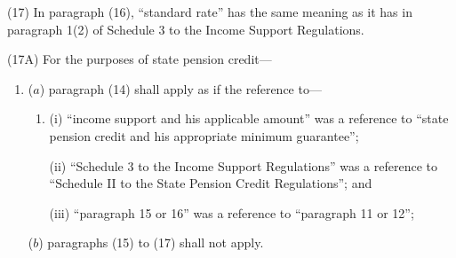 \documentclass[12pt,a4paper]{article}
\begin{document}
(17) In paragraph (16), “standard rate” has the same meaning as it has in paragraph 1(2) of Schedule 3 to the Income Support Regulations.

(17A) For the purposes of state pension credit—
\begin{enumerate}\item[]
($a$) paragraph (14) shall apply as if the reference to—
\begin{enumerate}\item[]
(i) “income support and his applicable amount” was a reference to “state pension credit and his appropriate minimum guarantee”;

(ii) “Schedule 3 to the Income Support Regulations” was a reference to “Schedule II to the State Pension Credit Regulations”; and

(iii) “paragraph 15 or 16” was a reference to “paragraph 11 or 12”;
\end{enumerate}

($b$) paragraphs (15) to (17) shall not apply.
\end{enumerate}

%
%
\end{document}
